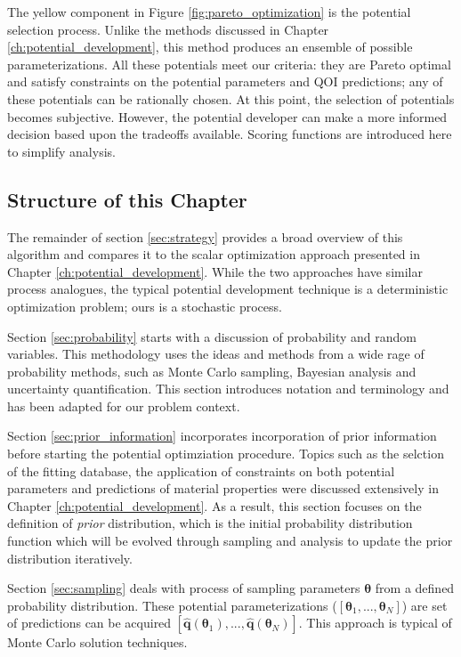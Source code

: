 The yellow component in Figure \ref{fig:pareto_optimization} is the potential selection process.  Unlike the methods discussed in Chapter \ref{ch:potential_development}, this method produces an ensemble of possible parameterizations.  All these potentials meet our criteria: they are Pareto optimal and satisfy constraints on the potential parameters and QOI predictions; any of these potentials can be rationally chosen.  At this point, the selection of potentials becomes subjective.  However, the potential developer can make a more informed decision based upon the tradeoffs available.  Scoring functions are introduced here to simplify analysis.

\subsection{Structure of this Chapter}

The remainder of section \ref{sec:strategy} provides a broad overview of this algorithm and compares it to the scalar optimization approach presented in Chapter \ref{ch:potential_development}.  While the two approaches have similar process analogues, the typical potential development technique is a deterministic optimization problem; ours is a stochastic process.

Section \ref{sec:probability} starts with a discussion of probability and random variables.  This methodology uses the ideas and methods from a wide rage of probability methods, such as Monte Carlo sampling, Bayesian analysis and uncertainty quantification.  This section introduces notation and terminology and has been adapted for our problem context.

Section \ref{sec:prior_information} incorporates incorporation of prior information before starting the potential optimziation procedure.  Topics such as the selction of the fitting database, the application of constraints on both potential parameters and predictions of material properties were discussed extensively in Chapter \ref{ch:potential_development}.  As a result, this section focuses on the definition of \emph{prior} distribution, which is the initial probability distribution function which will be evolved through sampling and analysis to update the prior distribution iteratively.

Section \ref{sec:sampling} deals with process of sampling parameters $\bm{\theta}$ from a defined probability distribution.  These potential parameterizations ($[\bm{\theta}_1,...,\bm{\theta}_N]$) are set of predictions can be acquired $[\hat{\bm{q}}(\bm{\theta}_1),...,\hat{\bm{q}}(\bm{\theta}_N)]$. This approach is typical of Monte Carlo solution techniques.

